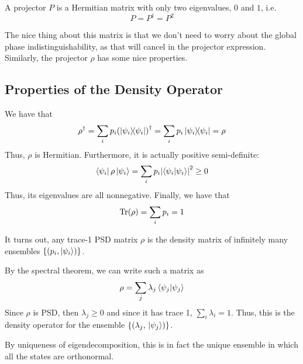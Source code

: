 \begin{definition}[Projector]
    A projector $P$ is a Hermitian matrix with only two eigenvalues, $0$ and $1$, i.e.
    \[ P = P^{\dagger} = P^2 \]
\end{definition}

The nice thing
about this matrix is that we don't need to worry about the global phase indistinguishability, as that will cancel in the
projector expression. Similarly, the projector $\rho$ has some nice properties.

\subsection{Properties of the Density Operator}

We have that
\[ \rho^{\dagger} = \sum_i p_i \qty(\ketbra{\psi_i}{\psi_i})^{\dagger} = \sum_i p_i \ketbra{\psi_i}{\psi_i} = \rho \]
Thus, $\rho$ is Hermitian. Furthermore, it is actually positive semi-definite:
\[ \bra{\psi_i} \rho \ket{\psi_i} = \sum_i p_i \qty|\braket{\psi_i}{\psi_i}|^2 \geq 0 \]
Thus, its eigenvalues are all nonnegative. Finally, we have that
\[ \Tr(\rho) = \sum_i p_i = 1 \]

\begin{theorem}
It turns out, any trace-1 PSD matrix $\rho$ is the density matrix of infinitely many
ensembles $\{(p_i, \ket{\psi_i})\}$.

\begin{proof*}
By the spectral theorem, we can write
such a matrix as
\[ \rho = \sum_j \lambda_j \braket{\psi_j}{\psi_j} \]
Since $\rho$ is PSD, then $\lambda_j \geq 0$ and since it has trace 1, $\sum_{i} \lambda_i = 1$.
Thus, this is the density operator for the ensemble $\{(\lambda_j, \ket*{\psi_j})\}$.

By uniqueness of eigendecomposition, this is in fact the unique ensemble in which all the states
are orthonormal.
\end{proof*}
\end{theorem}


